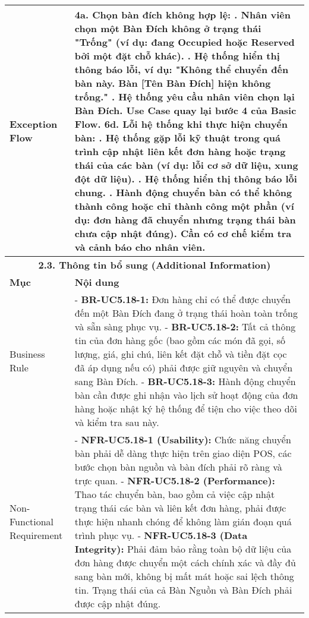 \begin{longtable}{|m{4cm}|p{11cm}|}
Exception Flow & \textbf{4a. Chọn bàn đích không hợp lệ:} \newline    1. Nhân viên chọn một Bàn Đích không ở trạng thái "Trống" (ví dụ: đang Occupied hoặc Reserved bởi một đặt chỗ khác). \newline    2. Hệ thống hiển thị thông báo lỗi, ví dụ: "Không thể chuyển đến bàn này. Bàn [Tên Bàn Đích] hiện không trống." \newline    3. Hệ thống yêu cầu nhân viên chọn lại Bàn Đích. Use Case quay lại bước 4 của Basic Flow. \newline \textbf{6d. Lỗi hệ thống khi thực hiện chuyển bàn:} \newline    1. Hệ thống gặp lỗi kỹ thuật trong quá trình cập nhật liên kết đơn hàng hoặc trạng thái của các bàn (ví dụ: lỗi cơ sở dữ liệu, xung đột dữ liệu). \newline    2. Hệ thống hiển thị thông báo lỗi chung. \newline    3. Hành động chuyển bàn có thể không thành công hoặc chỉ thành công một phần (ví dụ: đơn hàng đã chuyển nhưng trạng thái bàn chưa cập nhật đúng). Cần có cơ chế kiểm tra và cảnh báo cho nhân viên. \\
\hline
\multicolumn{2}{|c|}{\textbf{2.3. Thông tin bổ sung (Additional Information)}} \\
\hline
\textbf{Mục} & \textbf{Nội dung} \\
\hline
Business Rule & - \textbf{BR-UC5.18-1:} Đơn hàng chỉ có thể được chuyển đến một Bàn Đích đang ở trạng thái hoàn toàn trống và sẵn sàng phục vụ. \newline - \textbf{BR-UC5.18-2:} Tất cả thông tin của đơn hàng gốc (bao gồm các món đã gọi, số lượng, giá, ghi chú, liên kết đặt chỗ và tiền đặt cọc đã áp dụng nếu có) phải được giữ nguyên và chuyển sang Bàn Đích. \newline - \textbf{BR-UC5.18-3:} Hành động chuyển bàn cần được ghi nhận vào lịch sử hoạt động của đơn hàng hoặc nhật ký hệ thống để tiện cho việc theo dõi và kiểm tra sau này. \\
\hline
Non-Functional Requirement & - \textbf{NFR-UC5.18-1 (Usability):} Chức năng chuyển bàn phải dễ dàng thực hiện trên giao diện POS, các bước chọn bàn nguồn và bàn đích phải rõ ràng và trực quan. \newline - \textbf{NFR-UC5.18-2 (Performance):} Thao tác chuyển bàn, bao gồm cả việc cập nhật trạng thái các bàn và liên kết đơn hàng, phải được thực hiện nhanh chóng để không làm gián đoạn quá trình phục vụ. \newline - \textbf{NFR-UC5.18-3 (Data Integrity):} Phải đảm bảo rằng toàn bộ dữ liệu của đơn hàng được chuyển một cách chính xác và đầy đủ sang bàn mới, không bị mất mát hoặc sai lệch thông tin. Trạng thái của cả Bàn Nguồn và Bàn Đích phải được cập nhật đúng. \\
\hline
\end{longtable}

